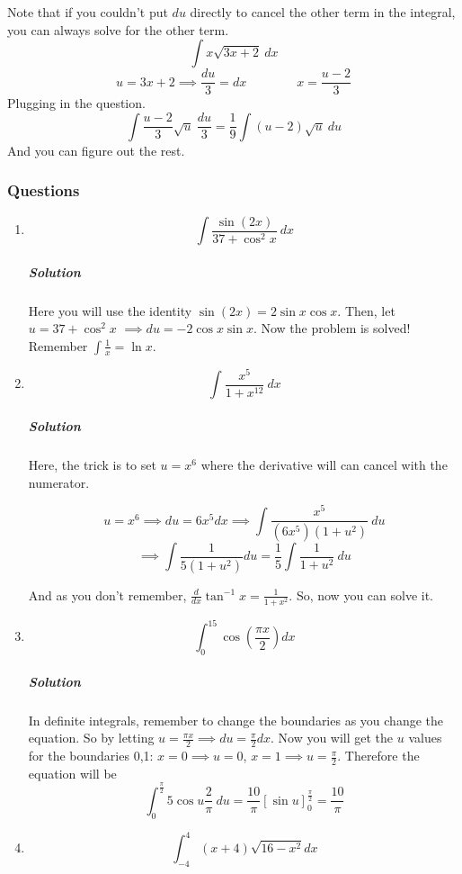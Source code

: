 \documentclass{article}
\begin{document}
	Note that if you couldn't put $du$ directly to cancel the other term in the integral, you can always solve for the other term.
	\[
		\int x \sqrt{ 3x+2 }\ dx 
	\]
	\[
		u = 3x + 2 \implies \frac{du}{3} = dx \qquad \qquad x = \frac{u-2}{3}
	\]
	Plugging in the  question.
	\[
		\int \frac{ u-2 }{ 3 } \sqrt{ u }\ \frac{du}{3} = \frac{1}{9} \int (u-2) \sqrt{ u }\ du 
	\]
	And you can figure out the rest.

	\newpage
	\subsubsection{Questions}
	\begin{enumerate}[1.]
		\item \[	\int \frac{ \sin(2x) }{ 37 + \cos^2{x}}\ dx  \]
			\subparagraph{Solution}

			Here you will use the identity $ \sin(2x) = 2 \sin{ x } \cos{ x }  $. Then, let $ u = 37+\cos^2x 
			$ $\implies du=-2 \cos{ x } \sin{ x } $. Now the problem is solved! Remember $\int \frac{1}{x}= \ln{x}$.

		\item \[ \int \frac{x^5}{1+x^{12}}\ dx \]

			\subparagraph{Solution}
			Here, the trick is to set $u=x^6$ where the derivative will can cancel with the numerator. 

			\[
				u = x^6 \implies du = 6x^5dx \implies \int \frac{ x^5 }{ (6x^5) (1+u^2) } \ du 
			\]
			\[
				\implies \int \frac{ 1 }{ 5(1+u^2) } du = \frac{1}{5} \int \frac{ 1 }{ 1 + u^2 }\ du
			\]

			And as you don't remember, $\frac{d}{dx} \tan^{-1}x= \frac{ 1 }{ 1 + x^2 }  $. So, now you can solve it. 

		\item \[
				\int_0^15 \cos{ (\frac{ \pi x }{ 2 } ) } dx
			\]

			\subparagraph{Solution}
			In definite integrals, remember to change the boundaries as you change the equation. 
			So by letting $u= \frac{ \pi x  }{ 2 } \implies du = \frac{\pi}{2} dx$. Now you will get the $u$ values for the boundaries 0,1: $ x=0 \implies u = 0 $, $ x = 1 \implies u = \frac{\pi}{2} $. Therefore the equation will be
			\[
				\int_0^{\frac{\pi}{2}} 5 \cos{ u } \frac{2}{\pi}\ du = \frac{10}{\pi} \left[ \sin{ u }  \right]^{ \frac{\pi}{2} }_{0} = \frac{10}{\pi}
			\]

		\item \[ \int^4_{-4} (x+4) \sqrt{ 16-x^2 } dx \]


\end{enumerate}
\end{document}
